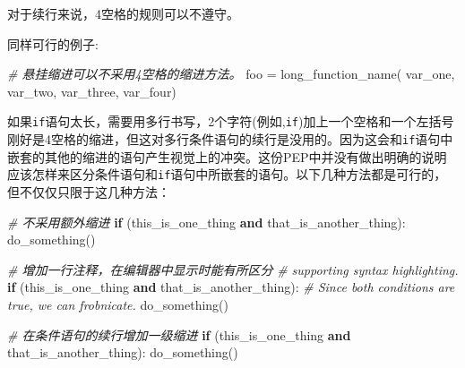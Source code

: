 \documentclass[ignorenonframetext,9pt]{beamer}
\newenvironment{Shaded}{}{}
\newcommand{\CommentTok}[1]{\textcolor[rgb]{0.38,0.63,0.69}{\textit{#1}}}
\newcommand{\ControlFlowTok}[1]{\textcolor[rgb]{0.00,0.44,0.13}{\textbf{#1}}}
\newcommand{\KeywordTok}[1]{\textcolor[rgb]{0.00,0.44,0.13}{\textbf{#1}}}
\newcommand{\NormalTok}[1]{#1}
\newcommand{\OperatorTok}[1]{\textcolor[rgb]{0.40,0.40,0.40}{#1}}
\begin{document}
\begin{frame}[fragile]
对于续行来说，4空格的规则可以不遵守。

同样可行的例子:

\begin{Shaded}
\begin{Highlighting}[]
\CommentTok{# 悬挂缩进可以不采用4空格的缩进方法。}
\NormalTok{foo }\OperatorTok{=}\NormalTok{ long_function_name(}
\NormalTok{  var_one, var_two,}
\NormalTok{  var_three, var_four)}
\end{Highlighting}
\end{Shaded}

\end{frame}

\begin{frame}[fragile]

如果\texttt{if}语句太长，需要用多行书写，2个字符(例如,\texttt{if})加上一个空格和一个左括号刚好是4空格的缩进，但这对多行条件语句的续行是没用的。因为这会和\texttt{if}语句中嵌套的其他的缩进的语句产生视觉上的冲突。这份PEP中并没有做出明确的说明应该怎样来区分条件语句和\texttt{if}语句中所嵌套的语句。以下几种方法都是可行的，但不仅仅只限于这几种方法：



\begin{Shaded}
\begin{Highlighting}[]
\CommentTok{# 不采用额外缩进}
\ControlFlowTok{if}\NormalTok{ (this_is_one_thing }\KeywordTok{and}
\NormalTok{    that_is_another_thing):}
\NormalTok{    do_something()}
\end{Highlighting}
\end{Shaded}
\end{frame}

\begin{frame}[fragile]
\begin{Shaded}
\begin{Highlighting}[]
\CommentTok{# 增加一行注释，在编辑器中显示时能有所区分}
\CommentTok{# supporting syntax highlighting.}
\ControlFlowTok{if}\NormalTok{ (this_is_one_thing }\KeywordTok{and}
\NormalTok{    that_is_another_thing):}
    \CommentTok{# Since both conditions are true, we can frobnicate.}
\NormalTok{    do_something()}

\CommentTok{# 在条件语句的续行增加一级缩进}
\ControlFlowTok{if}\NormalTok{ (this_is_one_thing}
        \KeywordTok{and}\NormalTok{ that_is_another_thing):}
\NormalTok{    do_something()}
\end{Highlighting}
\end{Shaded}

\end{frame}
\end{document}
